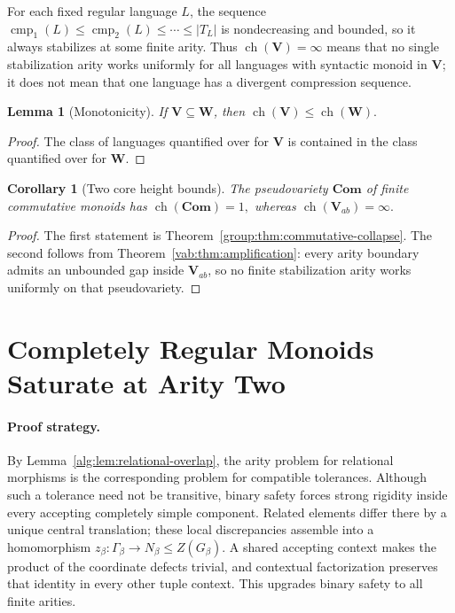 \documentclass[10pt,a4paper]{article}
\newtheorem{lemma}[theorem]{Lemma}
\newtheorem{corollary}[theorem]{Corollary}
\theoremstyle{definition}
\theoremstyle{remark}
\newcommand{\cmp}{\operatorname{cmp}}
\begin{document}
For each fixed regular language \(L\), the sequence
\(\cmp_1(L)\le\cmp_2(L)\le\cdots\le |T_L|\) is nondecreasing and bounded,
so it always stabilizes at some finite arity.  Thus
\(\operatorname{ch}(\mathbf V)=\infty\) means that no single stabilization
arity works uniformly for all languages with syntactic monoid in \(\mathbf
V\); it does not mean that one language has a divergent compression sequence.

\begin{lemma}[Monotonicity]
\label{ah:lem:monotone}
If \(\mathbf V\subseteq\mathbf W\), then
\(
\operatorname{ch}(\mathbf V)
\le
\operatorname{ch}(\mathbf W).
\)
\end{lemma}

\begin{proof}
The class of languages quantified over for \(\mathbf V\) is contained in the
class quantified over for \(\mathbf W\).
\end{proof}


\begin{corollary}[Two core height bounds]
\label{height:cor:core-bounds}
The pseudovariety \(\mathbf{Com}\) of finite commutative monoids has
\(\operatorname{ch}(\mathbf{Com})=1,\)
whereas
\(\operatorname{ch}(\mathbf V_{ab})=\infty.\)
\end{corollary}

\begin{proof}
The first statement is Theorem~\ref{group:thm:commutative-collapse}.  The
second follows from Theorem~\ref{vab:thm:amplification}: every arity boundary
admits an unbounded gap inside \(\mathbf V_{ab}\), so no finite stabilization
arity works uniformly on that pseudovariety.
\end{proof}


\section{Completely Regular Monoids Saturate at Arity Two}
\label{sec:cr-saturation}

\paragraph{Proof strategy.}
By Lemma~\ref{alg:lem:relational-overlap}, the arity problem for relational
morphisms is the corresponding problem for compatible tolerances.  Although
such a tolerance need not be transitive, binary safety forces strong rigidity
inside every accepting completely simple component.  Related elements differ
there by a unique central translation; these local discrepancies assemble
into a homomorphism
\(z_\beta:\Gamma_\beta\to N_\beta\le Z(G_\beta)\).
A shared accepting context makes the product of the coordinate defects
trivial, and contextual factorization preserves that identity in every other
tuple context.  This upgrades binary safety to all finite arities.
\end{document}
